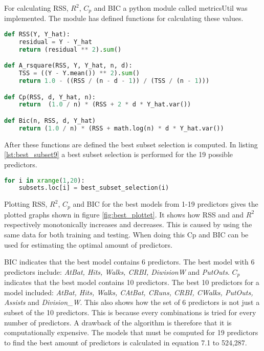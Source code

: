 For calculating RSS, $R^2$, $C_p$ and BIC a python module called metricsUtil was implemented. The module has defined functions for calculating these values.

\begin{lstlisting}[language=Python, label=lst:metricsUtil, caption={metricsUtil module for calculating RSS, $R^2$, $C_p$, BIC and RSS}]
def RSS(Y, Y_hat):
	residual = Y - Y_hat
	return (residual ** 2).sum()

def A_rsquare(RSS, Y, Y_hat, n, d):
	TSS = ((Y - Y.mean()) ** 2).sum()
	return 1.0 - ((RSS / (n - d - 1)) / (TSS / (n - 1)))

def Cp(RSS, d, Y_hat, n):
	return  (1.0 / n) * (RSS + 2 * d * Y_hat.var())

def Bic(n, RSS, d, Y_hat)
	return (1.0 / n) * (RSS + math.log(n) * d * Y_hat.var())
\end{lstlisting}

After these functions are defined the best subset selection is computed. In listing \ref{lst:best_subset9} a best subset selection is performed for the 19 possible predictors.

\begin{lstlisting}[language=Python, label=lst:best_subset9, caption=Calculating the best subset from 1 to 19 predictors]
for i in xrange(1,20):
	subsets.loc[i] = best_subset_selection(i)
\end{lstlisting}

Plotting RSS, $R^2$, $C_p$ and BIC for the best models from 1-19 predictors gives the plotted graphs shown in figure \ref{fig:best_plottet}. It shows how RSS and and $R^2$ respectively monotonically increases and decreases. This is caused by using the same data for both training and testing. When doing this Cp and BIC can be used for estimating the optimal amount of predictors.

\FloatBarrier


BIC indicates that the best model contains 6 predictors. The best model with 6 predictors include: \emph{AtBat, Hits, Walks, CRBI, DiwisionW} and \emph{PutOuts}. $C_p$ indicates that the best model contains 10 predictors. The best 10 predictors for a model included: \emph{AtBat, Hits, Walks, CAtBat, CRuns, CRBI, CWalks, PutOuts, Assists} and \emph{Division\_W}. This also shows how the set of 6 predictors is not just a subset of the 10 predictors. This is because every combinations is tried for every number of predictors. A drawback of the algorithm is therefore that it is computationally expensive. The models that must be computed for 19 predictors to find the best amount of predictors is calculated in equation 7.1 to 524,287.

